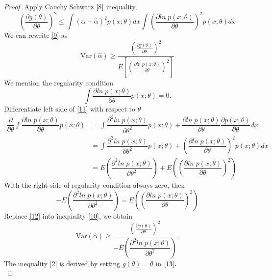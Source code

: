 \documentclass{article}
\begin{document}
\begin{proof}
Apply Cauchy Schwarz  $\eqref{8}$ inequality, 
\begin{equation}\label{9}
    \left(\dfrac{\partial g(\theta)}{\partial \theta}\right)^{2} \leq \int(\alpha - \widehat{\alpha})^{2}p(x;\theta)dx \int\left(\dfrac{\partial ln \; p(x;\theta)}{\partial \theta}\right)^{2}p(x;\theta)dx
\end{equation}
We can rewrite \eqref{9} as 
\begin{equation}\label{10}
\operatorname{Var(\widehat{\alpha})} \geq \dfrac{\left(\frac{\partial g(\theta)}{\partial \theta}\right)^{2}}{E\left[\left(\frac{\partial ln\;p(x;\theta)}{\partial \theta}\right)^{2}\right]}
\end{equation}
We mention the regularity condition 
\begin{equation}\label{11}
\int \dfrac{\partial ln\;p(x;\theta)}{\partial \theta}p(x;\theta)= 0.
\end{equation}
Differentiate left side of \eqref{11} with respect to $\theta$ \\
\begin{align*}
\dfrac{\partial }{\partial \theta}\int \dfrac{\partial ln\;p(x;\theta)}{\partial \theta}p(x;\theta) &= \int \dfrac{\partial^{2} ln\; p(x;\theta)}{\partial \theta^{2}}p(x;\theta) + \dfrac{\partial ln\;p(x;\theta)}{\partial \theta}\dfrac{\partial p(x;\theta)}{\partial \theta}dx \\
& = \int \dfrac{\partial^{2} ln\; p(x;\theta)}{\partial \theta^{2}}p(x;\theta) + \left(\dfrac{\partial ln\;p(x;\theta)}{\partial \theta}\right)^{2} p(x;\theta)dx \\
&= E\left(\dfrac{\partial^{2} ln\; p(x;\theta)}{\partial \theta^{2}}\right) + E\left(\left(\dfrac{\partial ln\;p(x;\theta)}{\partial \theta}\right)^{2}\right)
\end{align*}
With the right side of regularity condition always zero, then 
\begin{equation}\label{12}
    -E\left(\dfrac{\partial^{2} ln\; p(x;\theta)}{\partial \theta^{2}}\right) = E\left(\left(\dfrac{\partial ln\;p(x;\theta)}{\partial \theta}\right)^{2}\right)
\end{equation}
Replace \eqref{12} into inequality  \eqref{10}, we obtain
\begin{equation}\label{13}
    \operatorname{Var(\widehat{\alpha})} \geq \dfrac{\left(\frac{\partial g(\theta)}{\partial \theta}\right)^{2}}{-E\left(\dfrac{\partial^{2} ln\; p(x;\theta)}{\partial \theta^{2}}\right)}.
\end{equation}
The inequality \eqref{2} is derived by setting $g(\theta) = \theta$ in $\eqref{13}.$ \\

\end{proof}
\end{document}
